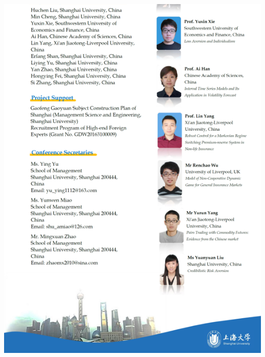 \documentclass[11pt]{article}%
\begin{document}
\begin{minipage}{1.\textwidth}
\begin{multicols}{2}
\includegraphics[width=1\linewidth]{training/PictureThanasi1_2.png}

\end{multicols}
\end{minipage}






















\cleardoublepage

\thispagestyle{Symposia}

\begin{minipage}[t]{0.99\textwidth}
\hypertarget{Symposia}{}
\end{minipage}
\end{document}
